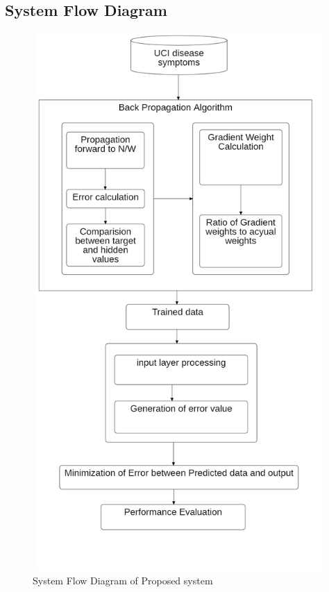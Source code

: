 \subsection{System Flow Diagram}
\begin{figure}[H]
\begin{center}
    
\includegraphics[width=140mm,height=205mm]{images/flow.png}
 \caption{System Flow Diagram of Proposed system}
 \end{center}                
\end{figure}

